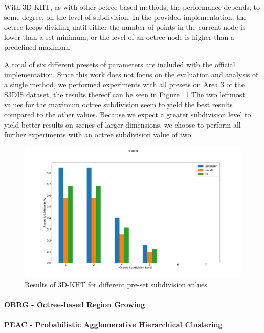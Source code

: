 \documentclass[main.tex]{subfiles}
\begin{document}
With 3D-KHT, as with other octree-based methods, the performance depends, to some degree, on the level of subdivision.
In the provided implementation, the octree keeps dividing until either the number of points in the current node is lower than a set minimum, or the
level of an octree node is higher than a predefined maximum.

A total of six different presets of parameters are included with the official implementation.
Since this work does not focus on the evaluation and analysis of a single method, we performed experiments with all presets on Area 3 of the S3DIS\cite{armeni_cvpr16} dataset, the
results thereof can be seen in Figure ~\ref{fig:3dkht_params}
The two leftmost values for the maximum octree subdivision seem to yield the best results compared to the other values.
Because we expect a greater subdivision level to yield better results on scenes of larger dimensions, we choose to perform
all further experiments with an octree subdivision value of two.


\begin{figure}[H]
    \centering
    \includegraphics[width=15 cm]{images/params_3dkht.png}
    \caption[3D-KHT Parameter Benchmark Results]{Results of 3D-KHT for different pre-set subdivision values}
    \label{fig:3dkht_params}
\end{figure}


\paragraph{OBRG - Octree-based Region Growing}
\paragraph{PEAC - Probabilistic Agglomerative Hierarchical Clustering}
\end{document}
